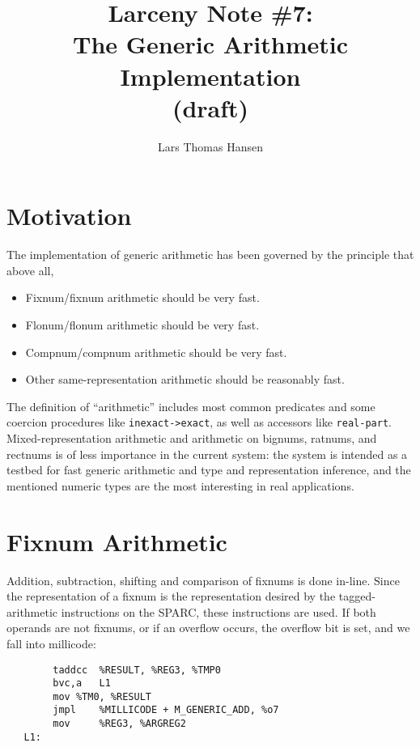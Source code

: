 %


\title{Larceny Note \#7: \\
       The Generic Arithmetic Implementation \\
       {\tenrm (draft)}}
\author{Lars Thomas Hansen}


\maketitle

\section{Motivation}

The implementation of generic arithmetic has been governed by the principle
that above all,

\begin{itemize}
\item Fixnum/fixnum arithmetic should be very fast.
\item Flonum/flonum arithmetic should be very fast.
\item Compnum/compnum arithmetic should be very fast.
\item Other same-representation arithmetic should be reasonably fast.
\end{itemize}

The definition of ``arithmetic'' includes most common predicates and
some coercion procedures like \verb+inexact->exact+, as well as accessors
like \verb+real-part+.
Mixed-representation arithmetic and arithmetic on bignums, ratnums,
and rectnums is of less importance in the current system: the system
is intended as a testbed for fast generic arithmetic and type and
representation inference, and the mentioned numeric types are the most
interesting in real applications.

\section{Fixnum Arithmetic}

Addition, subtraction, shifting and comparison of fixnums is done
in-line.  Since the representation of a fixnum is the representation
desired by the tagged-arithmetic instructions on the SPARC, these
instructions are used. If both operands are not fixnums, or if an
overflow occurs, the overflow bit is set, and we fall into millicode:

\begin{minipage}{\linewidth}
\begin{verbatim}
        taddcc  %RESULT, %REG3, %TMP0
        bvc,a   L1
        mov	%TM0, %RESULT
        jmpl    %MILLICODE + M_GENERIC_ADD, %o7
        mov     %REG3, %ARGREG2
   L1:
\end{verbatim}
\end{minipage}

